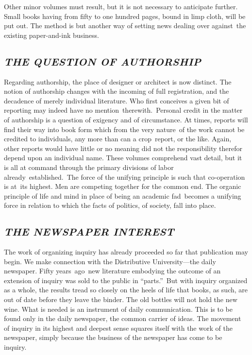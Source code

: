 \documentclass[twoside,symmetric,nobib,justified]{tufte-book}
\begin{document}
\vspace{.05in}

Other minor volumes must result, but it is not necessary to anticipate
further. Small books having from fifty to one hundred pages, bound in
limp cloth, will be put out. The method is but another way of setting
news dealing over against~the existing paper-and-ink business. ~

\hypertarget{the-question-of-authorship}{%
\subsection{\texorpdfstring{\emph{THE QUESTION OF
AUTHORSHIP}}{THE QUESTION OF AUTHORSHIP}}\label{the-question-of-authorship}}

Regarding authorship, the place of designer or architect is now
distinct. The notion of authorship changes with the incoming of full
registration, and the decadence of merely individual literature. Who
first conceives a given bit of reporting may indeed have no
mention~therewith.~Personal credit in the matter of authorship is a
question of exigency and of circumstance. At times, reports will find
their way into book form which from the very nature~of the work cannot
be credited to individuals, any more than can a crop~report, or the
like. Again, other reports would have little or no meaning did not the
responsibility therefor depend upon an individual name. These volumes
comprehend vast detail, but it is all at command through the primary
divisions of labor already~established.~The force of the unifying
principle is such that co-operation is at~its highest. Men are competing
together for the common end. The organic principle of life and mind in
place of being an academic fad~becomes a unifying force in relation to
which the facts of politics, of society, fall into place.~~

\hypertarget{the-newspaper-interest}{%
\subsection{\texorpdfstring{\emph{THE NEWSPAPER
INTEREST}}{THE NEWSPAPER INTEREST}}\label{the-newspaper-interest}}

The work of organizing inquiry has already proceeded so far that
publication may begin. We make connection with the Distributive
University---the daily newspaper. Fifty years~ago~new literature
embodying the outcome of an extension of inquiry was sold to the public
in ``parts.''~But with inquiry organized as a whole, the results tread
so closely on the heels of life that books, as such, are out of date
before they leave the binder. The old bottles will not hold the new
wine. What is needed is an instrument of daily communication. This is to
be found only in the daily newspaper, the common carrier of ideas. The
movement of inquiry in its highest and deepest sense squares itself with
the work of the newspaper, simply because the business of the newspaper
has come to be inquiry.~
\end{document}
